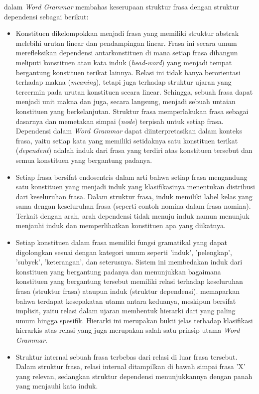 \cite{hudson2010introduction} dalam \textit{Word Grammar} membahas keserupaan struktur frasa dengan struktur dependensi sebagai berikut:
\begin{itemize}
\item Konstituen dikelompokkan menjadi frasa yang memiliki struktur abstrak melebihi urutan linear dan pendampingan linear. Frasa ini secara umum merefleksikan dependensi antarkonstituen di mana setiap frasa dibangun meliputi konstituen atau kata induk (\textit{head-word}) yang menjadi tempat bergantung konstituen terikat lainnya. Relasi ini tidak hanya berorientasi terhadap makna (\textit{meaning}), tetapi juga terhadap struktur ujaran yang tercermin pada urutan konstituen secara linear. Sehingga, sebuah frasa dapat menjadi unit makna dan juga, secara langsung, menjadi sebuah untaian konstituen yang berkelanjutan. Struktur frasa memperlakukan frasa sebagai dasarnya dan memetakan simpai (\textit{node}) terpisah untuk setiap frasa. Dependensi dalam \textit{Word Grammar} dapat diinterpretasikan dalam konteks frasa, yaitu setiap kata yang memiliki setidaknya satu konstituen terikat (\textit{dependent}) adalah induk dari frasa yang terdiri atas konstituen tersebut dan semua konstituen yang bergantung padanya.
\item Setiap frasa bersifat endosentris dalam arti bahwa setiap frasa mengandung satu konstituen yang menjadi induk yang klasifikasinya menentukan distribusi dari keseluruhan frasa. Dalam struktur frasa, induk memiliki label kelas yang sama dengan keseluruhan frasa (seperti contoh nomina dalam frasa nomina). Terkait dengan arah, arah dependensi tidak menuju induk namun menunjuk menjauhi induk dan memperlihatkan konstituen apa yang diikatnya.
\item Setiap konstituen dalam frasa memiliki fungsi gramatikal yang dapat digolongkan sesuai dengan kategori umum seperti 'induk', 'pelengkap', 'subyek', 'keterangan', dan seterusnya. Sistem ini membedakan induk dari konstituen yang bergantung padanya dan menunjukkan bagaimana konstituen yang bergantung tersebut memiliki relasi terhadap keseluruhan frasa (struktur frasa) ataupun induk (struktur dependensi). \cite{hudson2007language} memaparkan bahwa terdapat kesepakatan utama antara keduanya, meskipun bersifat implisit, yaitu relasi dalam ujaran membentuk hierarki dari yang paling umum hingga spesifik. Hierarki ini merupakan bukti jelas terhadap klasifikasi hierarkis atas relasi yang juga merupakan salah satu prinsip utama \textit{Word Grammar}.
\item Struktur internal sebuah frasa terbebas dari relasi di luar frasa tersebut. Dalam struktur frasa, relasi internal ditampilkan di bawah simpai frasa 'X' yang relevan, sedangkan struktur dependensi menunjukkannya dengan panah yang menjauhi kata induk.

\end{itemize}
